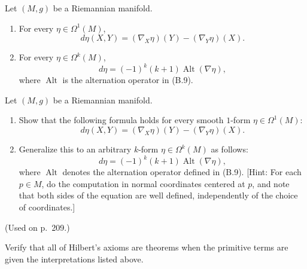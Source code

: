\begin{proposition}
\label{prop:exterior-derivative-covariant-formula}

Let $(M,g)$ be a Riemannian manifold.
\begin{enumerate}
\item[(a)] For every $\eta\in\Omega^1(M)$,
\[
d\eta(X,Y)=(\nabla_X\eta)(Y)-(\nabla_Y\eta)(X).
\]
\item[(b)] For every $\eta\in\Omega^k(M)$,
\[
d\eta=(-1)^k(k+1)\operatorname{Alt}(\nabla\eta),
\]
where $\operatorname{Alt}$ is the alternation operator in (B.9).
\end{enumerate}
\end{proposition}

\begin{exercise}
\label{prob:exterior-derivative-covariant-formula}

Let $(M,g)$ be a Riemannian manifold.
\begin{enumerate}
\item[(a)] Show that the following formula holds for every smooth $1$-form $\eta \in \Omega^1(M)$:
\[
d\eta(X,Y) = (\nabla_X \eta)(Y) - (\nabla_Y \eta)(X).
\]
\item[(b)] Generalize this to an arbitrary $k$-form $\eta \in \Omega^k(M)$ as follows:
\[
d\eta = (-1)^k(k+1)\operatorname{Alt}(\nabla\eta),
\]
where $\operatorname{Alt}$ denotes the alternation operator defined in (B.9). [Hint: For each $p \in M$, do the computation in normal coordinates centered at $p$, and note that both sides of the equation are well defined, independently of the choice of coordinates.]
\end{enumerate}
(Used on p.\ 209.)
\end{exercise}


\begin{exercise}
\label{exer:hilbert-axioms-euclidean-plane}

Verify that all of Hilbert's axioms are theorems when the primitive terms are given the interpretations listed above.
\end{exercise}

